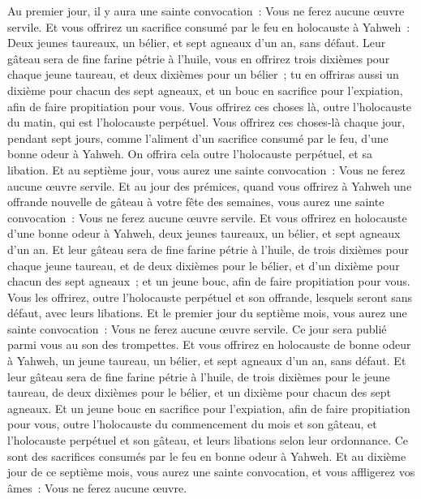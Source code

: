 \begin{multicols}{2}
Au premier jour, il y aura une sainte convocation~: Vous ne ferez aucune œuvre servile.
Et vous offrirez un sacrifice consumé par le feu en holocauste à Yahweh~: Deux jeunes taureaux, un bélier, et sept agneaux d'un an, sans défaut.
Leur gâteau sera de fine farine pétrie à l'huile, vous en offrirez trois dixièmes pour chaque jeune taureau, et deux dixièmes pour un bélier~;
tu en offriras aussi un dixième pour chacun des sept agneaux,
et un bouc en sacrifice pour l'expiation, afin de faire propitiation pour vous.
Vous offrirez ces choses là, outre l'holocauste du matin, qui est l'holocauste perpétuel.
Vous offrirez ces choses-là chaque jour, pendant sept jours, comme l'aliment d'un sacrifice consumé par le feu, d'une bonne odeur à Yahweh. On offrira cela outre l'holocauste perpétuel, et sa libation.
Et au septième jour, vous aurez une sainte convocation~: Vous ne ferez aucune œuvre servile.
Et au jour des prémices, quand vous offrirez à Yahweh une offrande nouvelle de gâteau à votre fête des semaines, vous aurez une sainte convocation~: Vous ne ferez aucune œuvre servile.
Et vous offrirez en holocauste d'une bonne odeur à Yahweh, deux jeunes taureaux, un bélier, et sept agneaux d'un an.
Et leur gâteau sera de fine farine pétrie à l'huile, de trois dixièmes pour chaque jeune taureau, et de deux dixièmes pour le bélier,
et d'un dixième pour chacun des sept agneaux~;
et un jeune bouc, afin de faire propitiation pour vous.
Vous les offrirez, outre l'holocauste perpétuel et son offrande, lesquels seront sans défaut, avec leurs libations.
\VerseOne{}Et le premier jour du septième mois, vous aurez une sainte convocation~: Vous ne ferez aucune œuvre servile. Ce jour sera publié parmi vous au son des trompettes.
Et vous offrirez en holocauste de bonne odeur à Yahweh, un jeune taureau, un bélier, et sept agneaux d'un an, sans défaut.
Et leur gâteau sera de fine farine pétrie à l'huile, de trois dixièmes pour le jeune taureau, de deux dixièmes pour le bélier,
et un dixième pour chacun des sept agneaux.
Et un jeune bouc en sacrifice pour l'expiation, afin de faire propitiation pour vous,
outre l'holocauste du commencement du mois et son gâteau, et l'holocauste perpétuel et son gâteau, et leurs libations selon leur ordonnance. Ce sont des sacrifices consumés par le feu en bonne odeur à Yahweh.
Et au dixième jour de ce septième mois, vous aurez une sainte convocation, et vous affligerez vos âmes~: Vous ne ferez aucune œuvre.

\end{multicols}
